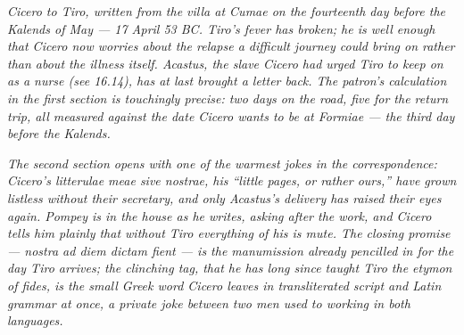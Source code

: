 
\textit{Cicero to Tiro, written from the villa at Cumae on the
fourteenth day before the Kalends of May --- 17 April 53 BC.
Tiro's fever has broken; he is well enough that Cicero now
worries about the relapse a difficult journey could bring on
rather than about the illness itself. Acastus, the slave Cicero
had urged Tiro to keep on as a nurse (see 16.14), has at last
brought a letter back. The patron's calculation in the first
section is touchingly precise: two days on the road, five for
the return trip, all measured against the date Cicero wants to
be at Formiae --- the third day before the Kalends.}

\textit{The second section opens with one of the warmest jokes
in the correspondence: Cicero's \textit{litterulae meae sive
nostrae}, his ``little pages, or rather ours,'' have grown
listless without their secretary, and only Acastus's delivery
has raised their eyes again. Pompey is in the house as he
writes, asking after the work, and Cicero tells him plainly
that without Tiro everything of his is mute. The closing
promise --- \textit{nostra ad diem dictam fient} --- is the
manumission already pencilled in for the day Tiro arrives; the
clinching tag, that he has long since taught Tiro the
\textit{etymon} of \textit{fides}, is the small Greek word
Cicero leaves in transliterated script and Latin grammar at
once, a private joke between two men used to working in both
languages.}
